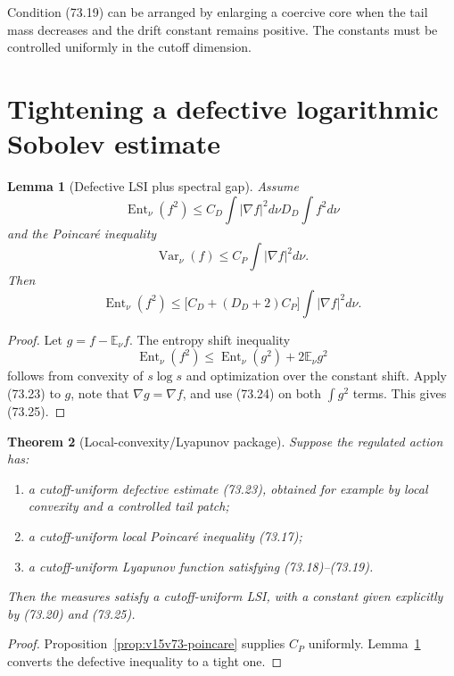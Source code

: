\documentclass[11pt]{article}
\newtheorem{theorem}{Theorem}[section]
\newtheorem{lemma}[theorem]{Lemma}
\theoremstyle{remark}
\begin{document}
Condition (73.19) can be arranged by enlarging a coercive core
when the tail mass decreases and the drift constant remains
positive.  The constants must be controlled uniformly in the
cutoff dimension.

\section{Tightening a defective logarithmic Sobolev estimate}

\begin{lemma}[Defective LSI plus spectral gap]
\label{lem:v15v73-tighten}
Assume
\[
 \operatorname{Ent}_\nu(f^2)
 \leq
 C_D\int|\nabla f|^2d\nu
 D_D\int f^2d\nu                                      \tag{73.23}
\]
and the Poincar\'e inequality
\[
 \operatorname{Var}_\nu(f)
 \leq C_P\int|\nabla f|^2d\nu.                        \tag{73.24}
\]
Then
\[
 \operatorname{Ent}_\nu(f^2)
 \leq
 \bigl[C_D+(D_D+2)C_P\bigr]
 \int|\nabla f|^2d\nu.                                \tag{73.25}
\]
\end{lemma}

\begin{proof}
Let \(g=f-\mathbb E_\nu f\).  The entropy shift inequality
\[
 \operatorname{Ent}_\nu(f^2)
 \leq
 \operatorname{Ent}_\nu(g^2)+2\mathbb E_\nu g^2       \tag{73.26}
\]
follows from convexity of \(s\log s\) and optimization over the
constant shift.  Apply (73.23) to \(g\), note that
\(\nabla g=\nabla f\), and use (73.24) on both
\(\int g^2\) terms.  This gives (73.25).
\end{proof}

\begin{theorem}[Local-convexity/Lyapunov package]
\label{thm:v15v73-package}
Suppose the regulated action has:
\begin{enumerate}
\item a cutoff-uniform defective estimate (73.23), obtained for
      example by local convexity and a controlled tail patch;
\item a cutoff-uniform local Poincar\'e inequality (73.17);
\item a cutoff-uniform Lyapunov function satisfying
      (73.18)--(73.19).
\end{enumerate}
Then the measures satisfy a cutoff-uniform LSI, with a constant
given explicitly by (73.20) and (73.25).
\end{theorem}

\begin{proof}
Proposition~\ref{prop:v15v73-poincare} supplies \(C_P\) uniformly.
Lemma~\ref{lem:v15v73-tighten} converts the defective inequality to
a tight one.
\end{proof}
\end{document}
